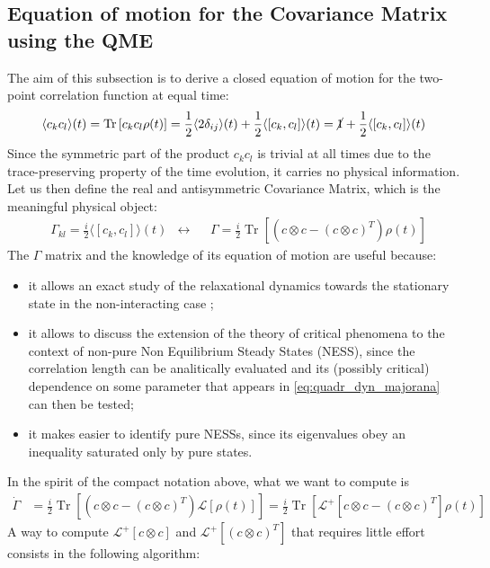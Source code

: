 \documentclass[a4paper,11pt]{article}
\DeclareMathOperator{\Tr}{Tr}
\theoremstyle{remark}
\newcommand{\mean}[1]{\ensuremath{\langle #1 \rangle}}
\newcommand{\ro}{\rho}
\newcommand{\nl}{\vskip 0.3cm}
\begin{document}
  \subsection{Equation of motion for the Covariance Matrix using the QME}
  The aim of this subsection is to derive a closed equation of motion for the two-point correlation function at equal time: \begin{equation*}
  \mean{c_kc_l}(t)=\Tr\left[c_kc_l\ro(t)\right]=\frac{1}{2}\mean{2\delta_{ij}}(t)+\frac{1}{2}\mean{[c_k,c_l]}(t)=\cancel{1}+\frac{1}{2}\mean{[c_k,c_l]}(t)
  \end{equation*}
  Since the symmetric part of the product $c_kc_l$ is trivial at all times due to the trace-preserving property of the time evolution, it carries no physical information. Let us then define the real and antisymmetric Covariance Matrix, which is the meaningful physical object:
  \begin{align}
   &\Gamma_{kl}=\frac{i}{2}\mean{\left[c_k,c_l\right]}(t) &  \longleftrightarrow & & \Gamma = \frac{i}{2}\Tr\left[\left(c\otimes c - (c\otimes c)^T\right)\ro(t)\right]
   \label{eq:def_covariance}
  \end{align}
  The $\Gamma$ matrix and the knowledge of its equation of motion are useful because:
  \begin{itemize}
   \item it allows an exact study of the relaxational dynamics towards the stationary state in the non-interacting case \cite{Eisert2010};
   \item it allows to discuss the extension of the theory of critical phenomena to the context of non-pure Non Equilibrium Steady States (NESS), since the correlation length can be analitically evaluated and its (possibly critical) dependence on some parameter that appears in \ref{eq:quadr_dyn_majorana} can then be tested;
   \item it makes easier to identify pure NESSs, since its eigenvalues obey an inequality saturated only by pure states.\nl
  \end{itemize}
  In the spirit of the compact notation above, what we want to compute is
  \begin{align*}
   \dot{\Gamma} &=  \frac{i}{2}\Tr\left[\left(c\otimes c - (c\otimes c)^T\right)\mathcal{L}\left[\ro(t)\right]\right]=  \frac{i}{2}\Tr\left[\mathcal{L}^+\!\!\left[c\otimes c - (c\otimes c)^T\right]\ro(t)\right]
  \end{align*}
  A way to compute  $\mathcal{L}^+\!\!\left[c\otimes c\right]$ and $\mathcal{L}^+\!\!\left[ (c\otimes c)^T\right]$ that requires little effort consists in the following algorithm:
\end{document}
